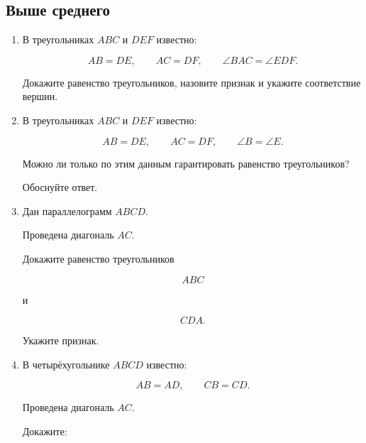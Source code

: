 \documentclass[a4paper,12pt]{article}
\begin{document}
\subsection*{Выше среднего}

\begin{enumerate}[
  label=\textbf{\arabic*.},
  start=4
]

\item
В треугольниках $ABC$ и $DEF$ известно:

\[
AB=DE,
\qquad
AC=DF,
\qquad
\angle BAC=\angle EDF.
\]

Докажите равенство треугольников,
назовите признак
и укажите соответствие вершин.

\item
В треугольниках $ABC$ и $DEF$ известно:

\[
AB=DE,
\qquad
AC=DF,
\qquad
\angle B=\angle E.
\]

Можно ли только по этим данным
гарантировать равенство треугольников?

Обоснуйте ответ.

\item
Дан параллелограмм $ABCD$.

Проведена диагональ $AC$.

Докажите равенство треугольников

\[
ABC
\]

и

\[
CDA.
\]

Укажите признак.

\begin{center}


\end{center}

\item
В четырёхугольнике $ABCD$ известно:

\[
AB=AD,
\qquad
CB=CD.
\]

Проведена диагональ $AC$.

Докажите:


\end{enumerate}
\end{document}
